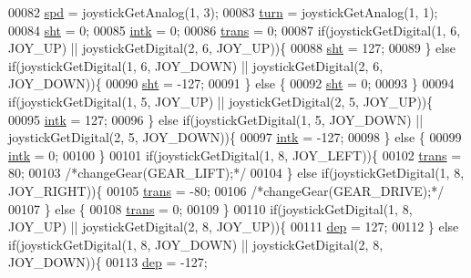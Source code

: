 \begin{DoxyCode}
00082     \hyperlink{opcontrol_8c_a642ce334330c8b0f6e33dd0a3fa65111}{spd} = joystickGetAnalog(1, 3);
00083     \hyperlink{opcontrol_8c_aaefa47f4fdf865c2358c22b542a993e4}{turn} = joystickGetAnalog(1, 1);
00084     \hyperlink{opcontrol_8c_ab9078d4ef28960b548a1621e2f6e9438}{sht} = 0;
00085     \hyperlink{opcontrol_8c_a0f71b6f71e93fa27c60c4dbbfc135bbb}{intk} = 0;
00086     \hyperlink{opcontrol_8c_a7039f0d5c4b6a662294b23dccf0bea0e}{trans} = 0;
00087     \textcolor{keywordflow}{if}(joystickGetDigital(1, 6, JOY\_UP) || joystickGetDigital(2, 6, JOY\_UP))\{
00088         \hyperlink{opcontrol_8c_ab9078d4ef28960b548a1621e2f6e9438}{sht} = 127;
00089     \} \textcolor{keywordflow}{else} \textcolor{keywordflow}{if}(joystickGetDigital(1, 6, JOY\_DOWN) || joystickGetDigital(2, 6, JOY\_DOWN))\{
00090         \hyperlink{opcontrol_8c_ab9078d4ef28960b548a1621e2f6e9438}{sht} = -127;
00091     \} \textcolor{keywordflow}{else} \{
00092         \hyperlink{opcontrol_8c_ab9078d4ef28960b548a1621e2f6e9438}{sht} = 0;
00093     \}
00094     \textcolor{keywordflow}{if}(joystickGetDigital(1, 5, JOY\_UP) || joystickGetDigital(2, 5, JOY\_UP))\{
00095         \hyperlink{opcontrol_8c_a0f71b6f71e93fa27c60c4dbbfc135bbb}{intk} = 127;
00096     \} \textcolor{keywordflow}{else} \textcolor{keywordflow}{if}(joystickGetDigital(1, 5, JOY\_DOWN) || joystickGetDigital(2, 5, JOY\_DOWN))\{
00097         \hyperlink{opcontrol_8c_a0f71b6f71e93fa27c60c4dbbfc135bbb}{intk} = -127;
00098     \} \textcolor{keywordflow}{else} \{
00099         \hyperlink{opcontrol_8c_a0f71b6f71e93fa27c60c4dbbfc135bbb}{intk} = 0;
00100     \}
00101     \textcolor{keywordflow}{if}(joystickGetDigital(1, 8, JOY\_LEFT))\{
00102         \hyperlink{opcontrol_8c_a7039f0d5c4b6a662294b23dccf0bea0e}{trans} = 80;
00103         \textcolor{comment}{/*changeGear(GEAR\_LIFT);*/}
00104     \} \textcolor{keywordflow}{else} \textcolor{keywordflow}{if}(joystickGetDigital(1, 8, JOY\_RIGHT))\{
00105         \hyperlink{opcontrol_8c_a7039f0d5c4b6a662294b23dccf0bea0e}{trans} = -80;
00106         \textcolor{comment}{/*changeGear(GEAR\_DRIVE);*/}
00107     \} \textcolor{keywordflow}{else} \{
00108         \hyperlink{opcontrol_8c_a7039f0d5c4b6a662294b23dccf0bea0e}{trans} = 0;
00109     \}
00110     \textcolor{keywordflow}{if}(joystickGetDigital(1, 8, JOY\_UP) || joystickGetDigital(2, 8, JOY\_UP))\{
00111         \hyperlink{opcontrol_8c_ada6c89c18e8b2a17151b9bc6b8ae060c}{dep} = 127;
00112     \} \textcolor{keywordflow}{else} \textcolor{keywordflow}{if}(joystickGetDigital(1, 8, JOY\_DOWN) || joystickGetDigital(2, 8, JOY\_DOWN))\{
00113         \hyperlink{opcontrol_8c_ada6c89c18e8b2a17151b9bc6b8ae060c}{dep} = -127;

\end{DoxyCode}
